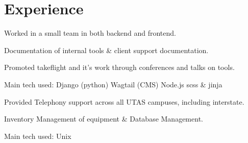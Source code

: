 \documentclass[a4paper]{deedy-resume} %
\begin{document}
\begin{minipage}[t]{0.66\textwidth} %


\section{Experience}


\vspace{\topsep} %
\begin{tightitemize}
\item Worked in a small team in both backend and frontend.
\item Documentation of internal tools \& client support documentation.
\item Promoted takeflight and it's work through conferences and talks on tools.
\end{tightitemize}
Main tech used: \textbullet{} Django (python) \textbullet{} Wagtail (CMS) \textbullet{} Node.js \textbullet{} scss \& jinja

\sectionspace %



\begin{tightitemize}
\item Provided Telephony support across all UTAS campuses, including interstate.
\item Inventory Management of equipment \& Database Management.
\end{tightitemize}
Main tech used: \textbullet{} Unix


\end{minipage}
\end{document}
